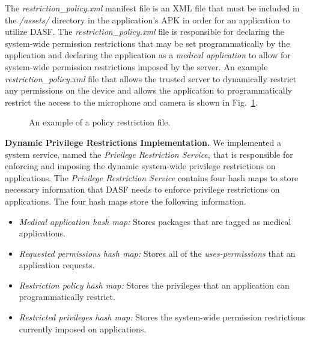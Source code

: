 The \textit{restriction\_policy.xml} manifest file is an XML file
that must be included in the \textit{/assets/} directory in the
application's APK in order for an application to utilize DASF.
The \textit{restriction\_policy.xml} file is responsible for declaring the
system-wide permission restrictions that may be set programmatically by
the application and declaring the application as a \textit{medical 
application} to allow for system-wide permission restrictions
imposed by the server. An example \textit{restriction\_policy.xml} file
that allows the trusted server to dynamically restrict any permissions
on the device and allows the application to programmatically restrict
the access to the microphone and camera is shown in
Fig.~\ref{fig:policy}.  

\begin{figure}[ht]
\centering
{}
\caption{An example of a policy restriction file.}
\label{fig:policy}
\end{figure}

\textbf{Dynamic Privilege Restrictions Implementation.}  We
implemented a system service, named the \textit{Privilege Restriction
 Service}, that is responsible for enforcing and imposing the
dynamic system-wide privilege restrictions on applications.  
The \textit{Privilege Restriction Service} contains four
hash maps to store necessary information that DASF needs
to enforce privilege restrictions on applications.  The four hash maps store
the following information.

\begin{itemize}
\item \textit{Medical application hash map:} Stores packages that are tagged
  as medical applications.
\item \textit{Requested permissions hash map:} Stores all of the \textit{uses-permissions}
  that an application requests.
\item \textit{Restriction policy hash map:} Stores the privileges that an application can
  programmatically restrict.
\item \textit{Restricted privileges hash map:} Stores the system-wide permission
  restrictions currently imposed on applications.
\end{itemize}

